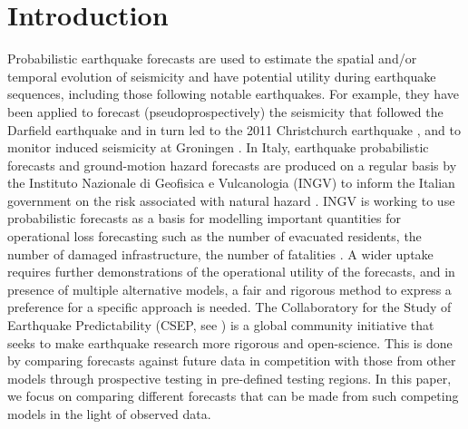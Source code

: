 \documentclass[referee,sn-basic]{sn-jnl}
\theoremstyle{thmstyleone}%
\theoremstyle{thmstyletwo}%
\theoremstyle{thmstylethree}%
\begin{document}



\maketitle

\section{Introduction}
\label{sec:intro}

Probabilistic earthquake forecasts are used to estimate the spatial and/or temporal evolution of seismicity and have potential utility during earthquake sequences, including those following notable earthquakes. For example, they have been applied to forecast (pseudoprospectively) the seismicity that followed the Darfield earthquake and in turn led to the 2011 Christchurch earthquake \citep{rhoades2016retrospective}, and to monitor induced seismicity at Groningen \citep{bourne2018exponential}. In Italy, earthquake probabilistic forecasts and ground-motion hazard forecasts are produced on a regular basis by the Instituto Nazionale di Geofisica e Vulcanologia (INGV) to inform the Italian government on the risk associated with natural hazard \citep{marzocchi2014establishment}. INGV is working to use probabilistic forecasts as a basis for modelling important quantities for operational loss forecasting such as the number of evacuated residents, the number of damaged infrastructure, the number of fatalities \citep{iervolino2015operational}. A wider uptake requires further demonstrations of the operational utility of the forecasts, and in presence of multiple alternative models, a fair and rigorous method to express a preference for a specific approach is needed. The Collaboratory for the Study of Earthquake Predictability (CSEP, see \cite{jordan2006brick,zechar2010csep,achievements}) is a global community initiative that seeks to make earthquake research more rigorous and open-science. This is done by comparing forecasts against future data in competition with those from other models through prospective testing in pre-defined testing regions. In this paper, we focus on comparing different forecasts that can be made from such competing models in the light of observed data.
\end{document}
